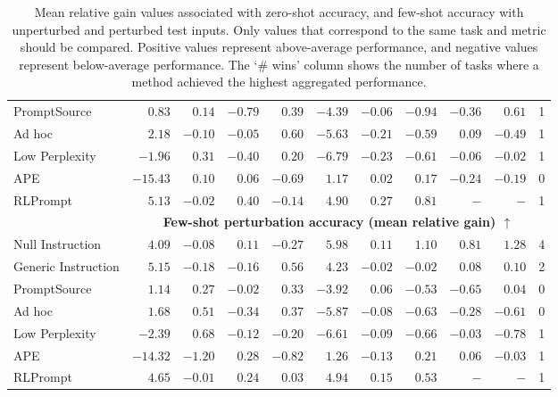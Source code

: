 \begin{table*}[htbp]
{\begin{tabular}{lrrrrrrrrrc}
\greyrule
PromptSource        &   $0.83$ &  $0.14$ & $-0.79$ &  $0.39$ & $-4.39$ &   $-0.06$ &  $-0.94$ &  $-0.36$ &  $\mathbf{0.61}$ & 1\\
Ad hoc              &   $2.18$ & $-0.10$ & $-0.05$ &  $\mathbf{0.60}$ & $-5.63$ &   $-0.21$ &  $-0.59$ &   $0.09$ & $-0.49$ & 1\\
\greyrule
Low Perplexity      &  $-1.96$ &  $\mathbf{0.31}$ & $-0.40$ &  $0.20$ & $-6.79$ &   $-0.23$ &  $-0.61$ &  $-0.06$ & $-0.02$ & 1\\
APE                 & $-15.43$ &  $0.10$ &  $0.06$ & $-0.69$ &  $1.17$ &    $0.02$ &   $0.17$ &  $-0.24$ & $-0.19$ & 0\\
RLPrompt            &   $5.13$ & $-0.02$ &  $0.40$ & $-0.14$ &  $4.90$ &    $\mathbf{0.27}$ &   $0.81$ &      $-$ &     $-$ & 1\\
\midrule
\rowcolor{gray!20} & \multicolumn{10}{c}{\bf{Few-shot perturbation accuracy (mean relative gain) $\uparrow$}} \\ 
\midrule
Null Instruction    &   $4.09$ & $-0.08$ &  $0.11$ & $-0.27$ &  $\mathbf{5.98}$ &    $0.11$ &   $\mathbf{1.10}$ &   $\mathbf{0.81}$ &  $\mathbf{1.28}$ & 4\\
Generic Instruction &   $\mathbf{5.15}$ & $-0.18$ & $-0.16$ &  $\mathbf{0.56}$ &  $4.23$ &   $-0.02$ &  $-0.02$ &   $0.08$ &  $0.10$ & 2\\
\greyrule
PromptSource        &   $1.14$ &  $0.27$ & $-0.02$ &  $0.33$ & $-3.92$ &    $0.06$ &  $-0.53$ &  $-0.65$ &  $0.04$ & 0\\
Ad hoc              &   $1.68$ &  $0.51$ & $-0.34$ &  $0.37$ & $-5.87$ &   $-0.08$ &  $-0.63$ &  $-0.28$ & $-0.61$ & 0\\
\greyrule
Low Perplexity      &  $-2.39$ &  $\mathbf{0.68}$ & $-0.12$ & $-0.20$ & $-6.61$ &   $-0.09$ &  $-0.66$ &  $-0.03$ & $-0.78$ & 1\\
APE                 & $-14.32$ & $-1.20$ &  $\mathbf{0.28}$ & $-0.82$ &  $1.26$ &   $-0.13$ &   $0.21$ &   $0.06$ & $-0.03$ & 1\\
RLPrompt            &   $4.65$ & $-0.01$ &  $0.24$ &  $0.03$ &  $4.94$ &    $\mathbf{0.15}$ &   $0.53$ &      $-$ &     $-$ & 1\\
\bottomrule
\end{tabular}
}
\caption{Mean relative gain values associated with zero-shot accuracy, and few-shot accuracy with unperturbed and perturbed test inputs. Only values that correspond to the same task and metric should be compared. Positive values represent above-average performance, and negative values represent below-average performance. The `\# wins' column shows the number of tasks where a method achieved the highest aggregated performance.
}
\label{table:accuracy_perc}
\end{table*}
